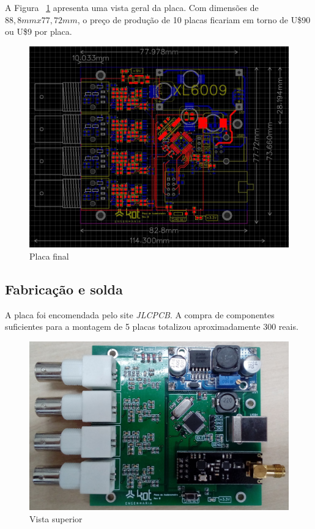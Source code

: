 \documentclass[
	12pt,				%
	openright,			%
	twoside,			%
	a4paper,			%
	english,			%
	french,				%
	spanish,			%
	brazil,				%
	]{abntex2}
\begin{document}
			A Figura ~\ref{fig:placaFinal} apresenta uma vista geral da placa. Com dimensões de
			$88,8mmx77,72mm$, o preço de produção de 10 placas ficariam em torno de
			U\$90 ou U\$9 por placa.

			\begin{figure}[H]
				\centering
				\includegraphics[width=\linewidth]{../Fotos/placaTotal.jpg}
				\caption{Placa final}
				\label{fig:placaFinal}
			\end{figure}

			\newpage

		\subsection{Fabricação e solda}
			A placa foi encomendada pelo site \textit{JLCPCB}. A compra de componentes suficientes para a montagem de 5 placas totalizou aproximadamente 300 reais.

			\begin{figure}[H]
				\centering
				\includegraphics[width=\linewidth]{../Fotos/vistaSuperior.jpg}
				\caption{Vista superior}
			\end{figure}
		\newpage
\end{document}
